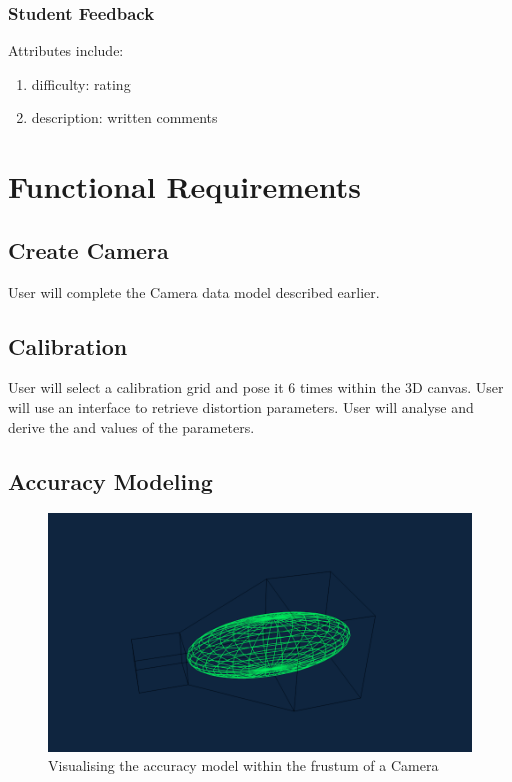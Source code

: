 \documentclass[11pt]{report}
\begin{document}
\subsubsection{Student Feedback}

Attributes include: 
\begin{enumerate}
\item difficulty: rating 
\item description: written comments 
\end{enumerate}

\section{Functional Requirements}

\subsection{Create Camera}

User will complete the Camera data model described earlier. 

\subsection{Calibration}

User will select a calibration grid and pose it 6 times within the 3D canvas. 
User will use an  interface to retrieve distortion parameters.
User will analyse and derive the  and  values of the parameters. 

\subsection{Accuracy Modeling}


\begin{figure}[htp]
\centering
\includegraphics[scale=0.50]{images/accuracy_vizulization.png}
\caption{Visualising the accuracy model within the frustum of a Camera }
\label{fig:av}
\end{figure}
\end{document}
